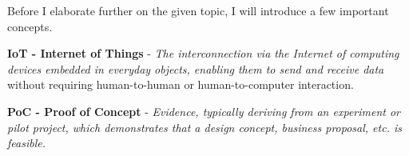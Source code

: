 \linebreak
Before I elaborate further on the given topic, I will introduce a few important concepts.

\textbf{IoT - Internet of Things} - \textit{The interconnection via the Internet of computing devices embedded in everyday objects, enabling them to send and receive data} \cite{IoT-dictionary} without requiring human-to-human or human-to-computer interaction. \cite{IoT-definition-no-interaction}

\textbf{PoC - Proof of Concept} - \textit{Evidence, typically deriving from an experiment or pilot project, which demonstrates that a design concept, business proposal, etc. is feasible.} \cite{PoC-dictionary}
